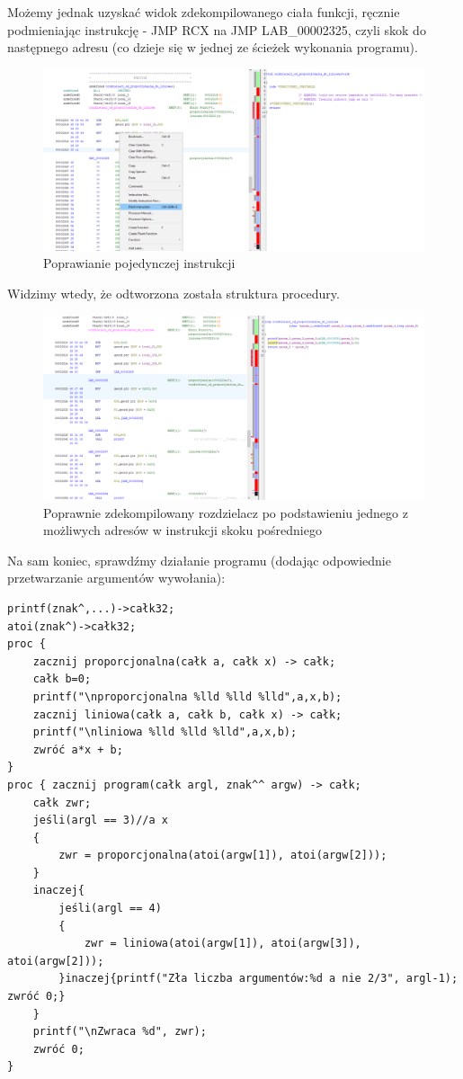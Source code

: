 Możemy jednak uzyskać widok zdekompilowanego ciała funkcji, ręcznie podmieniając instrukcję - JMP RCX na JMP LAB\_00002325, czyli skok do następnego adresu (co dzieje się w jednej ze ścieżek wykonania programu). 
\FloatBarrier
\begin{figure}[H]
    \centering
    \includegraphics[width=1.2\textwidth]{images/2.rozdzielacz/3.png}
    \caption{Poprawianie pojedynczej instrukcji}
\end{figure}
Widzimy wtedy, że odtworzona została struktura procedury.
\begin{figure}[H]
    \centering
    \includegraphics[width=1.2\textwidth]{images/2.rozdzielacz/4.png}
    \caption{Poprawnie zdekompilowany rozdzielacz po podstawieniu jednego z możliwych adresów w instrukcji skoku pośredniego}%
\end{figure}

Na sam koniec, sprawdźmy działanie programu (dodając odpowiednie przetwarzanie argumentów wywołania):
\begin{lstlisting}
printf(znak^,...)->całk32;
atoi(znak^)->całk32;
proc {
    zacznij proporcjonalna(całk a, całk x) -> całk;
    całk b=0;
    printf("\nproporcjonalna %lld %lld %lld",a,x,b);
    zacznij liniowa(całk a, całk b, całk x) -> całk;
    printf("\nliniowa %lld %lld %lld",a,x,b);
    zwróć a*x + b;
}
proc { zacznij program(całk argl, znak^^ argw) -> całk;
    całk zwr;
    jeśli(argl == 3)//a x
    {
        zwr = proporcjonalna(atoi(argw[1]), atoi(argw[2]));
    }
    inaczej{
        jeśli(argl == 4)
        {
            zwr = liniowa(atoi(argw[1]), atoi(argw[3]), atoi(argw[2]));
        }inaczej{printf("Zła liczba argumentów:%d a nie 2/3", argl-1); zwróć 0;}
    }
    printf("\nZwraca %d", zwr);
    zwróć 0;
}
\end{lstlisting}

